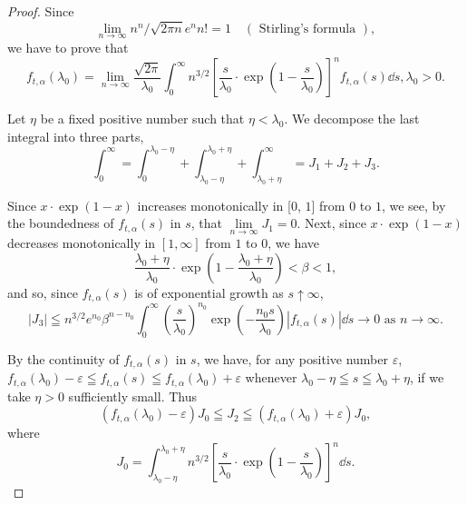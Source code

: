 \begin{proof}
Since 
\[
\lim\limits _{n \rightarrow \infty} n ^{n} / \sqrt {2 \pi n} e ^{n} n! = 1 \quad (\text{ Stirling's formula }),
\]
we have to prove that 
\begin{equation}\label{eq:IX.11.11}
f _{t, \alpha} (\lambda_{0}) = \lim\limits _{n \rightarrow \infty} \frac {\sqrt {2 \pi}}{\lambda_{0}} \int_{0} ^{\infty} n ^{3/2} \left[ \frac {s}{\lambda_{0}} \cdot \exp \left(1 - \frac {s}{\lambda_{0}}\right)\right] ^{n} f _{t, \alpha} (s) \dd s, \lambda_{0} > 0.
\end{equation}

Let $\eta$ be a fixed positive number such that $\eta < \lambda_0$. We decompose the last integral into three parts, 
\[
\int_{0} ^{\infty} = \int_{0} ^ {\lambda_{0} - \eta} + \int_ {\lambda_{0} - \eta} ^ {\lambda_{0} + \eta} + \int_ {\lambda_{0} + \eta} ^{\infty} = J _{1} + J _{2} + J _{3}.
\]

Since $x \cdot \exp(1 - x)$ increases monotonically in [$0$, $1$] from $0$ to $1$, we see, by the boundedness of $f_{t,\alpha}(s)$ in $s$, that $\lim\limits_{n\to \infty}J_1 = 0$. Next, since $x\cdot \exp (1 - x)$ decreases monotonically in $[1,\infty]$ from $1$ to $0$, we have 
\[
\frac {\lambda_{0} + \eta}{\lambda_{0}} \cdot \exp \left(1 - \frac {\lambda_{0} + \eta}{\lambda_{0}}\right) < \beta < 1,
\]
and so, since $f_{t,\alpha}(s)$ is of exponential growth as $s \uparrow \infty$, 
\[
\left| J _{3} \right| \leqq n ^{3/2} e ^ {n _{0}} \beta^ {n - n _{0}} \int_{0} ^{\infty} \left(\frac {s}{\lambda_{0}}\right) ^ {n _{0}} \exp \left(- \frac {n _{0} s}{\lambda_{0}}\right)\left| f _{t, \alpha} (s) \right| \dd s \rightarrow 0 \text{ as } n \rightarrow \infty .
\]

By the continuity of $f_{t,\alpha}(s)$ in $s$, we have, for any positive number $\varepsilon$, $f_{t,\alpha}(\lambda_0) - \varepsilon \leqq f_{t,\alpha}(s) \leqq f_{t,\alpha}(\lambda_0) + \varepsilon$ whenever $\lambda_0 - \eta \leqq s \leqq \lambda_0 + \eta$, if we take $\eta > 0$ sufficiently small. Thus 
\begin{equation}\label{eq:IX.11.12}
\left(f _{t, \alpha} (\lambda_{0}) - \varepsilon\right) J _{0} \leqq J _{2} \leqq \left(f _{t, \alpha} (\lambda_{0}) + \varepsilon\right) J _{0},
\end{equation}
where 
\begin{equation}\label{eq:IX.11.13}
J _{0} = \int_ {\lambda_{0} - \eta} ^ {\lambda_{0} + \eta} n ^{3/2} \left[ \frac {s}{\lambda_{0}} \cdot \exp \left(1 - \frac {s}{\lambda_{0}}\right) \right] ^{n} \dd s.
\end{equation}


\end{proof}
